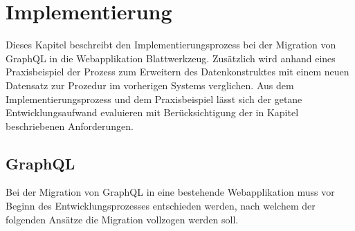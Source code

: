 

\chapter{Implementierung}
Dieses Kapitel beschreibt den Implementierungsprozess bei der Migration von GraphQL in die Webapplikation Blattwerkzeug. Zusätzlich wird anhand eines Praxisbeispiel der Prozess zum Erweitern des Datenkonstruktes mit einem neuen Datensatz zur Prozedur im vorherigen Systems verglichen. Aus dem Implementierungsprozess und dem Praxisbeispiel lässt sich der getane Entwicklungsaufwand evaluieren mit Berücksichtigung der in Kapitel  beschriebenen Anforderungen.

\section{GraphQL}
Bei der Migration von GraphQL in eine bestehende Webapplikation muss vor Beginn des Entwicklungsprozesses entschieden werden, nach welchem der folgenden Ansätze die Migration vollzogen werden soll.

